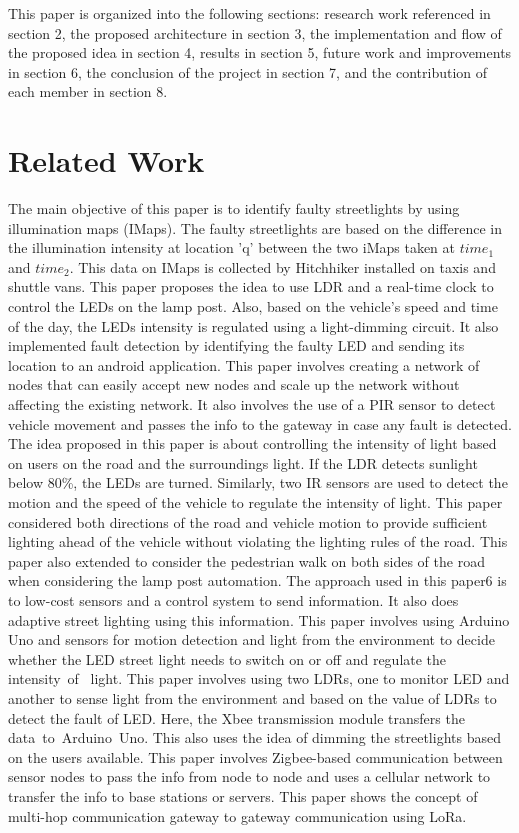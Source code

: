 \documentclass[11pt, oneside]{article}   	%
\begin{document}
This paper is organized into the following sections: research work referenced in section 2, the proposed architecture in section 3, the implementation and flow of the proposed idea 
in section 4, results in section 5, future work and improvements in section 6, the conclusion of the project in section 7, and the contribution of each member in section 8.



\section{Related Work}
The main objective of this paper \cite{1} is to identify faulty streetlights by using illumination maps (IMaps). The faulty streetlights are based on the difference in the illumination intensity at 
location 'q' between the two iMaps taken at $time_1$ and $time_2$. This data on IMaps is collected by Hitchhiker installed on taxis and shuttle vans. This paper \cite{2} proposes the idea to use LDR and a real-time clock to control the LEDs on the lamp post. Also, based on the vehicle's speed and time of the day, the LEDs intensity is regulated using a 
light-dimming circuit. It also implemented fault detection by identifying the faulty LED and sending its location to an android application. This paper \cite{3} involves creating a network of nodes that can easily accept new nodes and scale up the network without affecting the existing network. It also involves the use of a PIR sensor to detect 
vehicle movement and passes the info to the gateway in case any fault is detected. The idea proposed in this paper \cite{4} is about controlling the intensity of light based on users on the road and the surroundings light. If the LDR detects sunlight below 80\%, the LEDs are turned. 
Similarly, two IR sensors are used to detect the motion and the speed of the vehicle to regulate the intensity of light. This paper \cite{5} considered both directions of the road and vehicle motion to provide sufficient lighting ahead of the vehicle without violating the lighting rules of the road. This paper \cite{6} also extended to 
consider the pedestrian walk on both sides of the road when considering the lamp post automation. The approach used in this paper6 is to low-cost sensors and a control system to send information. It also does adaptive street lighting using this information.
This paper \cite{7} involves using Arduino Uno and sensors for motion detection and light from the environment to decide whether the LED street light needs to switch on or off and regulate the intensity of
 light. This paper \cite{8} involves using two LDRs, one to monitor LED and another to sense light from the environment and based on the value of LDRs to detect the fault of LED. Here, the Xbee transmission module 
transfers the data to Arduino Uno. This also uses the idea of dimming the streetlights based on the users available. This paper \cite{9} involves Zigbee-based communication between sensor nodes to pass the info from node to node and uses a cellular network to transfer the info to base stations or servers.
This paper \cite{10} shows the concept of multi-hop communication gateway to gateway communication using LoRa.
\end{document}
